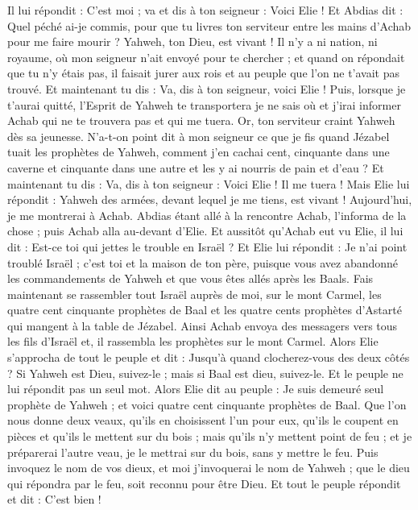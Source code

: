 \begin{multicols}{2}
Il lui répondit : C'est moi ; va et dis à ton seigneur : Voici Elie !
Et Abdias dit : Quel péché ai-je commis, pour que tu livres ton serviteur entre les mains d'Achab pour me faire mourir ?
Yahweh, ton Dieu, est vivant ! Il n'y a ni nation, ni royaume, où mon seigneur n'ait envoyé pour te chercher ; et quand on répondait que tu n'y étais pas, il faisait jurer aux rois et au peuple que l'on ne t’avait pas trouvé.
Et maintenant tu dis : Va, dis à ton seigneur, voici Elie !
Puis, lorsque je t’aurai quitté, l'Esprit de Yahweh te transportera je ne sais où et j’irai informer Achab qui ne te trouvera pas et qui me tuera. Or, ton serviteur craint Yahweh dès sa jeunesse.
N'a-t-on point dit à mon seigneur ce que je fis quand Jézabel tuait les prophètes de Yahweh, comment j'en cachai cent, cinquante dans une caverne et cinquante dans une autre et les y ai nourris de pain et d'eau ?
Et maintenant tu dis : Va, dis à ton seigneur : Voici Elie ! Il me tuera !
Mais Elie lui répondit : Yahweh des armées, devant lequel je me tiens, est vivant ! Aujourd'hui, je me montrerai à Achab.
Abdias étant allé à la rencontre Achab, l’informa de la chose ; puis Achab alla au-devant d'Elie.
Et aussitôt qu'Achab eut vu Elie, il lui dit : Est-ce toi qui jettes le trouble en Israël ?
Et Elie lui répondit : Je n'ai point troublé Israël ; c'est toi et la maison de ton père, puisque vous avez abandonné les commandements de Yahweh et que vous êtes allés après les Baals.
Fais maintenant se rassembler tout Israël auprès de moi, sur le mont Carmel, les quatre cent cinquante prophètes de Baal et les quatre cents prophètes d’Astarté qui mangent à la table de Jézabel.
Ainsi Achab envoya des messagers vers tous les fils d'Israël et, il rassembla les prophètes sur le mont Carmel.
Alors Elie s'approcha de tout le peuple et dit : Jusqu'à quand clocherez-vous des deux côtés ? Si Yahweh est Dieu, suivez-le ; mais si Baal est dieu, suivez-le. Et le peuple ne lui répondit pas un seul mot.
Alors Elie dit au peuple : Je suis demeuré seul prophète de Yahweh ; et voici quatre cent cinquante prophètes de Baal.
Que l’on nous donne deux veaux, qu'ils en choisissent l'un pour eux, qu'ils le coupent en pièces et qu'ils le mettent sur du bois ; mais qu'ils n'y mettent point de feu ; et je préparerai l'autre veau, je le mettrai sur du bois, sans y mettre le feu.
Puis invoquez le nom de vos dieux, et moi j'invoquerai le nom de Yahweh ; que le dieu qui répondra par le feu, soit reconnu pour être Dieu. Et tout le peuple répondit et dit : C'est bien !

\end{multicols}
